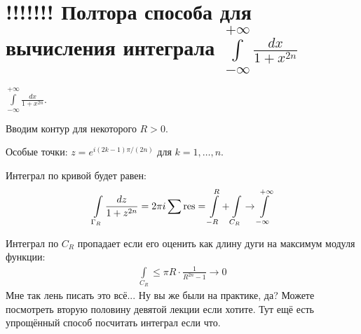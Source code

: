 \section{!!!!!!! Полтора способа для вычисления интеграла $\int\limits_{-\infty}^{+\infty} \frac{dx}{1+x^{2n}}$}

\begin{example}
    $\int\limits_{-\infty}^{+\infty} \frac{dx}{1+x^{2n}}$.

    Вводим контур для некоторого $R > 0$.

    \begin{center}
    \end{center}

    Особые точки: $z = e^{i(2k-1)\pi / (2n)}$ для $k = 1, \ldots, n$.

    Интеграл по кривой будет равен:
    \begin{gather*}
        \int\limits_{\Gamma_R} \frac{dz}{1+z^{2n}} = 2\pi i \sum \operatorname*{res}
        = \int\limits_{-R}^R + \int\limits_{C_R} \to \int\limits_{-\infty}^{+\infty}        
    \end{gather*}

    Интеграл по $C_R$ пропадает если его оценить
    как длину дуги на максимум модуля функции:
    \begin{gather*}
        \int\limits_{C_R} \le \pi R \cdot \frac{1}{R^{2n}-1} \to 0
    \end{gather*}
    Мне так лень писать это всё... Ну вы же были на практике, да?
    Можете посмотреть вторую половину девятой лекции если хотите.
    Тут ещё есть упрощённый способ посчитать интеграл если что.
\end{example}

\newpage

